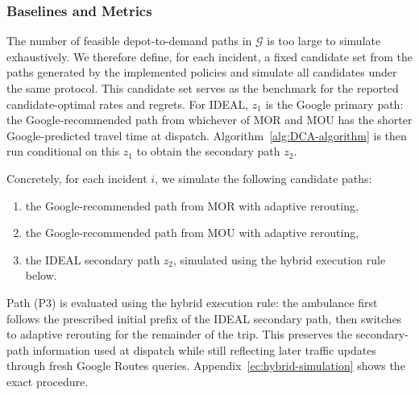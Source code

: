 \documentclass[11pt, letterpaper, oneside, reqno]{amsart}
\begin{document}
\subsubsection{Baselines and Metrics}
The number of feasible depot-to-demand paths in $\mathcal G$ is too large to simulate exhaustively. We therefore define, for each incident, a fixed candidate set from the paths generated by the implemented policies and simulate all candidates under the same protocol. This candidate set serves as the benchmark for the reported candidate-optimal rates and regrets. For IDEAL, $z_1$ is the Google primary path: the Google-recommended path from whichever of MOR and MOU has the shorter Google-predicted travel time at dispatch. Algorithm~\ref{alg:DCA-algorithm} is then run conditional on this $z_1$ to obtain the secondary path $z_2$.

Concretely, for each incident $i$, we simulate the following candidate paths:
\begin{enumerate}[leftmargin=10mm]
\item[(P1)] the Google-recommended path from MOR with adaptive rerouting,
\item[(P2)] the Google-recommended path from MOU with adaptive rerouting,
\item[(P3)] the IDEAL secondary path $z_2$, simulated using the hybrid execution rule below.
\end{enumerate}
Path (P3) is evaluated using the hybrid execution rule: the ambulance first follows the prescribed initial prefix of the IDEAL secondary path, then switches to adaptive rerouting for the remainder of the trip. This preserves the secondary-path information used at dispatch while still reflecting later traffic updates through fresh Google Routes queries. Appendix~\ref{ec:hybrid-simulation} shows the exact procedure.
\end{document}
